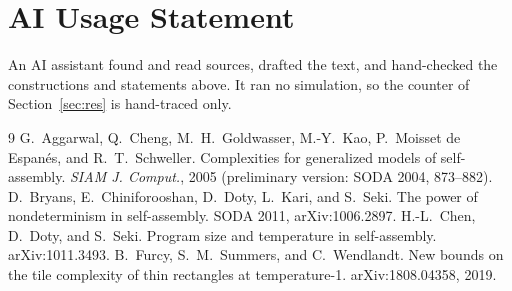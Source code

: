 \documentclass[10pt]{hackr26}
\begin{document}
\section*{AI Usage Statement}
An AI assistant found and read sources, drafted the text, and hand-checked the constructions and statements above.
It ran no simulation, so the counter of Section~\ref{sec:res} is hand-traced only.

\small
\begin{thebibliography}{9}
 G.~Aggarwal, Q.~Cheng, M.~H.~Goldwasser, M.-Y.~Kao, P.~Moisset de Espan\'es, and R.~T.~Schweller. Complexities for generalized models of self-assembly. {\em SIAM J. Comput.}, 2005 (preliminary version: SODA 2004, 873--882).
 D.~Bryans, E.~Chiniforooshan, D.~Doty, L.~Kari, and S.~Seki. The power of nondeterminism in self-assembly. SODA 2011, arXiv:1006.2897.
 H.-L.~Chen, D.~Doty, and S.~Seki. Program size and temperature in self-assembly. arXiv:1011.3493.
 B.~Furcy, S.~M.~Summers, and C.~Wendlandt. New bounds on the tile complexity of thin rectangles at temperature-1. arXiv:1808.04358, 2019.
\end{thebibliography}
\end{document}
